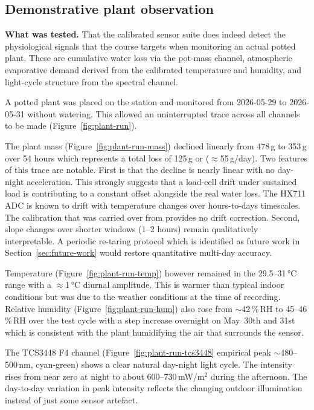 \subsection{Demonstrative plant observation}
\label{sec:plant-run}

\textbf{What was tested.} That the calibrated sensor suite does indeed detect the physiological signals that the course targets when monitoring an actual potted plant. These are cumulative water loss via the pot-mass channel, atmospheric evaporative demand derived from the calibrated temperature and humidity, and light-cycle structure from the spectral channel.

A potted plant was placed on the station and monitored from 2026-05-29 to 2026-05-31 without watering. This allowed an uninterrupted trace across all channels to be made (Figure~\ref{fig:plant-run}).

The plant mass (Figure~\ref{fig:plant-run-mass}) declined linearly from 478\,g to 353\,g over 54 hours which represents a total loss of 125\,g or ($\approx$55\,g/day). Two features of this trace are notable. First is that the decline is nearly linear with no day-night acceleration. This strongly suggests that a load-cell drift under sustained load is contributing to a constant offset alongside the real water loss. The HX711 ADC is known to drift with temperature changes over hours-to-days timescales. The calibration that was carried over from \textcite{colinet2025} provides no drift correction. Second, slope changes over shorter windows (1--2 hours) remain qualitatively interpretable. A periodic re-taring protocol which is identified as future work in Section~\ref{sec:future-work} would restore quantitative multi-day accuracy.

Temperature (Figure~\ref{fig:plant-run-temp}) however remained in the 29.5--31\,°C range with a $\approx$1\,°C diurnal amplitude. This is warmer than typical indoor conditions but was due to the weather conditions at the time of recording. Relative humidity (Figure~\ref{fig:plant-run-hum}) also rose from $\sim$42\,\%\,RH to 45--46\,\%\,RH over the test cycle with a step increase overnight on May~30th and 31st which is consistent with the plant humidifying the air that surrounds the sensor. 

The TCS3448 F4 channel (Figure~\ref{fig:plant-run-tcs3448} empirical peak $\sim$480--500\,nm, cyan-green) shows a clear natural day-night light cycle. The intensity rises from near zero at night to about 600--730\,mW/m$^2$ during the afternoon. The day-to-day variation in peak intensity reflects the changing outdoor illumination instead of just some sensor artefact.

